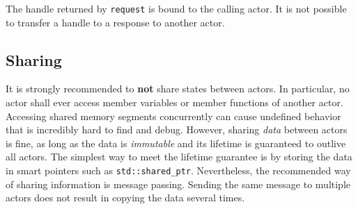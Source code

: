 The handle returned by \lstinline^request^ is bound to the calling actor. It is
not possible to transfer a handle to a response to another actor.

\clearpage
\subsection{Sharing}

It is strongly recommended to \textbf{not} share states between actors. In
particular, no actor shall ever access member variables or member functions of
another actor. Accessing shared memory segments concurrently can cause undefined
behavior that is incredibly hard to find and debug. However, sharing
\textit{data} between actors is fine, as long as the data is \textit{immutable}
and its lifetime is guaranteed to outlive all actors. The simplest way to meet
the lifetime guarantee is by storing the data in smart pointers such as
\lstinline^std::shared_ptr^. Nevertheless, the recommended way of sharing
information is message passing. Sending the same message to multiple actors
does not result in copying the data several times.
